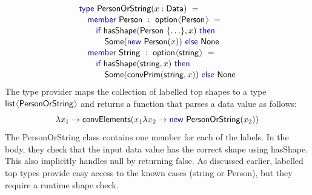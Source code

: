 \documentclass[10pt,preprint,clearpagebib]{sigplanconf}
\newcommand{\langl}{\begin{picture}(4.5,7)
\put(1.1,2.5){\rotatebox{60}{\line(1,0){5.5}}}
\put(1.1,2.5){\rotatebox{300}{\line(1,0){5.5}}}
\end{picture}}
\newcommand{\rangl}{\begin{picture}(4.5,7)
\put(.9,2.5){\rotatebox{120}{\line(1,0){5.5}}}
\put(.9,2.5){\rotatebox{240}{\line(1,0){5.5}}}
\end{picture}}
\newcommand{\kvd}[1]{\textnormal{\textcolor{kvdclr}{\sffamily #1}}}
\newcommand{\ident}[1]{\textnormal{\sffamily #1}}
\begin{document}
\noindent
\begin{equation*}
\begin{array}{l}
 \kvd{type}~\ident{PersonOrString}(x:\ident{Data})~= \\[0.1em]
 \quad \kvd{member}~\ident{Person}~:~\ident{option}\langl\ident{Person}\rangl~= \\[0.1em]
 \qquad \kvd{if}~\ident{hasShape}(\ident{Person}~\{ \ldots \}, x)~\kvd{then}\\[0.1em]
 \qquad\quad \ident{Some}(\kvd{new}~\ident{Person}(x))~\kvd{else}~\ident{None} \\[0.1em]
 \quad \kvd{member}~\ident{String}~:~\ident{option}\langl\ident{string}\rangl~= \\[0.1em]
 \qquad \kvd{if}~\ident{hasShape}(\ident{string}, x)~\kvd{then}\\[0.1em]
 \qquad\quad \ident{Some}(\ident{convPrim}(\ident{string}, x))~\kvd{else}~\ident{None}
\end{array}
\end{equation*}
%
The type provider maps the collection of labelled top shapes to a type $\ident{list}\langl\ident{PersonOrString}\rangl$
and returns a function that parses a data value as follows:
%
\begin{equation*}
\lambda x_1\rightarrow \ident{convElements}(x_1\lambda x_2\rightarrow\kvd{new}~\ident{PersonOrString}(x_2))
\end{equation*}
%
The \ident{PersonOrString} class contains one member for each of the labels. In the body, they
check that the input data value has the correct shape using \ident{hasShape}. This also implicitly 
handles \kvd{null} by returning \kvd{false}. As discussed earlier, labelled top types provide easy 
access to the known cases (\ident{string} or \ident{Person}), but they require a runtime shape check.

%
%
\end{document}
